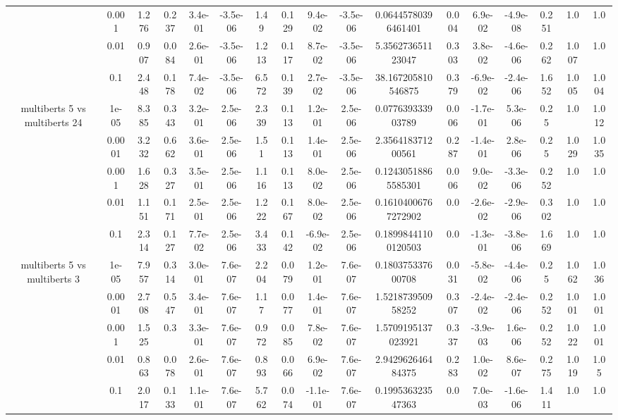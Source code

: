 \begin{tabular}{|c|c|c|c|c|c|c|c|c|c|c|c|c|c|c|c|c|}
 & 0.001 & 1.276 & 0.237 & 3.4e-01 & -3.5e-06 & 1.49 & 0.129 & 9.4e-02 & -3.5e-06 & 0.06445780396461401 & 0.004 & 6.9e-02 & -4.9e-08 & 0.251 & 1.0 & 1.0 \\
 & 0.01 & 0.907 & 0.084 & 2.6e-01 & -3.5e-06 & 1.213 & 0.117 & 8.7e-02 & -3.5e-06 & 5.356273651123047 & 0.303 & 3.8e-02 & -4.6e-06 & 0.262 & 1.007 & 1.0 \\
 & 0.1 & 2.448 & 0.178 & 7.4e-02 & -3.5e-06 & 6.572 & 0.139 & 2.7e-02 & -3.5e-06 & 38.167205810546875 & 0.379 & -6.9e-02 & -2.4e-06 & 1.652 & 1.005 & 1.004 \\
\hline
\multirow{5}{*}{multiberts 5 vs multiberts 24} & 1e-05 & 8.385 & 0.343 & 3.2e-01 & 2.5e-06 & 2.339 & 0.113 & 1.2e-01 & 2.5e-06 & 0.077639333903789 & 0.006 & -1.7e-01 & 5.3e-06 & 0.25 & 1.0 & 1.012 \\
 & 0.0001 & 3.232 & 0.662 & 3.6e-01 & 2.5e-06 & 1.51 & 0.113 & 1.4e-01 & 2.5e-06 & 2.356418371200561 & 0.287 & -1.4e-01 & 2.8e-06 & 0.25 & 1.029 & 1.035 \\
 & 0.001 & 1.628 & 0.327 & 3.5e-01 & 2.5e-06 & 1.116 & 0.113 & 8.0e-02 & 2.5e-06 & 0.12430518865585301 & 0.006 & 9.0e-02 & -3.3e-06 & 0.252 & 1.0 & 1.0 \\
 & 0.01 & 1.151 & 0.171 & 2.5e-01 & 2.5e-06 & 1.222 & 0.167 & 8.0e-02 & 2.5e-06 & 0.16104006767272902 & 0.0 & -2.6e-02 & -2.9e-06 & 0.302 & 1.0 & 1.0 \\
 & 0.1 & 2.314 & 0.127 & 7.7e-02 & 2.5e-06 & 3.433 & 0.142 & -6.9e-02 & 2.5e-06 & 0.18998441100120503 & 0.0 & -1.3e-01 & -3.8e-06 & 1.669 & 1.0 & 1.0 \\
\hline
\multirow{5}{*}{multiberts 5 vs multiberts 3} & 1e-05 & 7.957 & 0.314 & 3.0e-01 & 7.6e-07 & 2.204 & 0.079 & 1.2e-01 & 7.6e-07 & 0.180375337600708 & 0.031 & -5.8e-02 & -4.4e-06 & 0.25 & 1.062 & 1.036 \\
 & 0.0001 & 2.708 & 0.547 & 3.4e-01 & 7.6e-07 & 1.17 & 0.077 & 1.4e-01 & 7.6e-07 & 1.521873950958252 & 0.307 & -2.4e-02 & -2.4e-06 & 0.252 & 1.001 & 1.001 \\
 & 0.001 & 1.525 & 0.3 & 3.3e-01 & 7.6e-07 & 0.972 & 0.085 & 7.8e-02 & 7.6e-07 & 1.5709195137023921 & 0.337 & -3.9e-03 & 1.6e-06 & 0.252 & 1.022 & 1.001 \\
 & 0.01 & 0.863 & 0.078 & 2.6e-01 & 7.6e-07 & 0.893 & 0.066 & 6.9e-02 & 7.6e-07 & 2.942962646484375 & 0.283 & 1.0e-02 & 8.6e-07 & 0.275 & 1.019 & 1.05 \\
 & 0.1 & 2.017 & 0.133 & 1.1e-01 & 7.6e-07 & 5.762 & 0.074 & -1.1e-01 & 7.6e-07 & 0.199536323547363 & 0.0 & 7.0e-03 & -1.6e-06 & 1.411 & 1.0 & 1.0 \\

\end{tabular}
